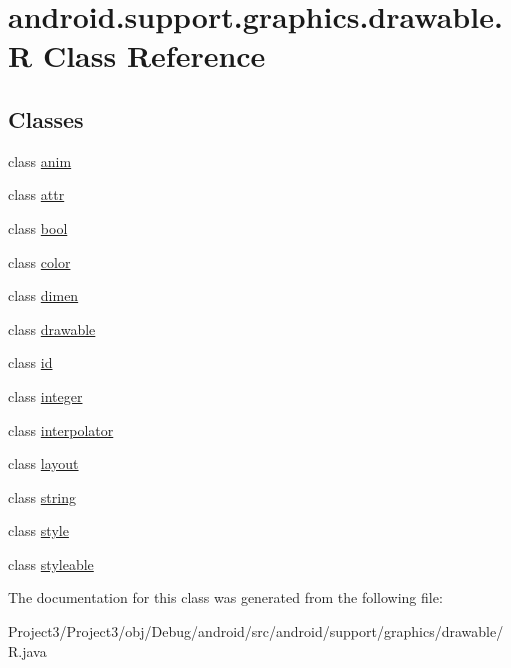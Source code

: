 \hypertarget{classandroid_1_1support_1_1graphics_1_1drawable_1_1R}{}\section{android.\+support.\+graphics.\+drawable.\+R Class Reference}
\label{classandroid_1_1support_1_1graphics_1_1drawable_1_1R}
\subsection*{Classes}
\begin{DoxyCompactItemize}
\item 
class \hyperlink{classandroid_1_1support_1_1graphics_1_1drawable_1_1R_1_1anim}{anim}
\item 
class \hyperlink{classandroid_1_1support_1_1graphics_1_1drawable_1_1R_1_1attr}{attr}
\item 
class \hyperlink{classandroid_1_1support_1_1graphics_1_1drawable_1_1R_1_1bool}{bool}
\item 
class \hyperlink{classandroid_1_1support_1_1graphics_1_1drawable_1_1R_1_1color}{color}
\item 
class \hyperlink{classandroid_1_1support_1_1graphics_1_1drawable_1_1R_1_1dimen}{dimen}
\item 
class \hyperlink{classandroid_1_1support_1_1graphics_1_1drawable_1_1R_1_1drawable}{drawable}
\item 
class \hyperlink{classandroid_1_1support_1_1graphics_1_1drawable_1_1R_1_1id}{id}
\item 
class \hyperlink{classandroid_1_1support_1_1graphics_1_1drawable_1_1R_1_1integer}{integer}
\item 
class \hyperlink{classandroid_1_1support_1_1graphics_1_1drawable_1_1R_1_1interpolator}{interpolator}
\item 
class \hyperlink{classandroid_1_1support_1_1graphics_1_1drawable_1_1R_1_1layout}{layout}
\item 
class \hyperlink{classandroid_1_1support_1_1graphics_1_1drawable_1_1R_1_1string}{string}
\item 
class \hyperlink{classandroid_1_1support_1_1graphics_1_1drawable_1_1R_1_1style}{style}
\item 
class \hyperlink{classandroid_1_1support_1_1graphics_1_1drawable_1_1R_1_1styleable}{styleable}
\end{DoxyCompactItemize}


The documentation for this class was generated from the following file\+:\begin{DoxyCompactItemize}
\item 
Project3/\+Project3/obj/\+Debug/android/src/android/support/graphics/drawable/R.\+java\end{DoxyCompactItemize}
